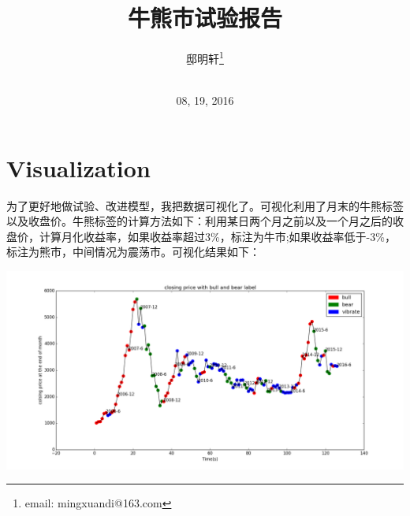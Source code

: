 \documentclass[10pt,a4paper]{article}
\author{邸明轩\footnote{email: mingxuandi@163.com}\\[2ex]
	\\[2ex]}
\title{牛熊市试验报告 \uppercase\expandafter{\romannumeral4}}
\date{08, 19, 2016}
\begin{document}
	
	\makeatletter
	\let\@afterindentfalse\@afterindenttrue
	\@afterindenttrue
	\makeatother
	\setlength{\parindent}{2em}  %
	
	\maketitle
	
\section{Visualization }
为了更好地做试验、改进模型，我把数据可视化了。可视化利用了月末的牛熊标签以及收盘价。牛熊标签的计算方法如下：利用某日两个月之前以及一个月之后的收盘价，计算月化收益率，如果收益率超过3\%，标注为牛市;如果收益率低于-3\%，标注为熊市，中间情况为震荡市。可视化结果如下：
	\begin{center}
		\includegraphics[width=1\textwidth]{标注可视化.png}
	\end{center}
\end{document}
